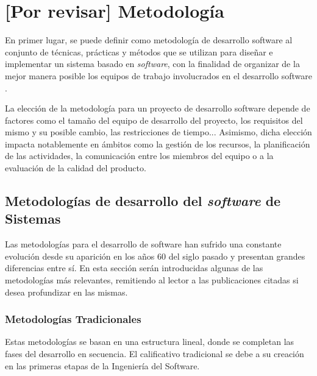 \chapter{[Por revisar] Metodología}
\label{chapter:metodologia}


En primer lugar, se puede definir como metodología de desarrollo software al conjunto de técnicas, prácticas y métodos que se utilizan para diseñar e implementar un sistema basado en \textit{software}, con la finalidad de organizar de la mejor manera posible los equipos de trabajo involucrados en el desarrollo software \cite{santander_universidades_metodologias_2020}.

La elección de la metodología para un proyecto de desarrollo software depende de factores como el tamaño del equipo de desarrollo del proyecto, los requisitos del mismo y su posible cambio, las restricciones de tiempo... Asimismo, dicha elección impacta notablemente en ámbitos como la gestión de los recursos, la planificación de las actividades, la comunicación entre los miembros del equipo o a la evaluación de la calidad del producto.

\section{Metodologías de desarrollo del \textit{software} de Sistemas}

    Las metodologías para el desarrollo de software han sufrido una constante evolución desde su aparición en los años 60 del siglo pasado y presentan grandes diferencias entre sí. En esta sección serán introducidas algunas de las metodologías más relevantes, remitiendo al lector a las publicaciones citadas si desea profundizar en las mismas.

    \subsection{Metodologías Tradicionales}
    
        Estas metodologías se basan en una estructura lineal, donde se completan las fases del desarrollo en secuencia. El calificativo tradicional se debe a su creación en las primeras etapas de la Ingeniería del Software.
    
